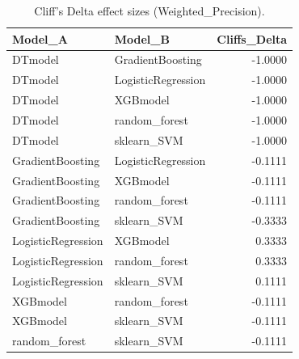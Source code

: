 \begin{table}[t]
\centering
\begin{tabular}{llr}
\toprule
Model_A & Model_B & Cliffs_Delta \\
\midrule
DTmodel & GradientBoosting & -1.0000 \\
DTmodel & LogisticRegression & -1.0000 \\
DTmodel & XGBmodel & -1.0000 \\
DTmodel & random_forest & -1.0000 \\
DTmodel & sklearn_SVM & -1.0000 \\
GradientBoosting & LogisticRegression & -0.1111 \\
GradientBoosting & XGBmodel & -0.1111 \\
GradientBoosting & random_forest & -0.1111 \\
GradientBoosting & sklearn_SVM & -0.3333 \\
LogisticRegression & XGBmodel & 0.3333 \\
LogisticRegression & random_forest & 0.3333 \\
LogisticRegression & sklearn_SVM & 0.1111 \\
XGBmodel & random_forest & -0.1111 \\
XGBmodel & sklearn_SVM & -0.1111 \\
random_forest & sklearn_SVM & -0.1111 \\
\bottomrule
\end{tabular}
\caption{Cliff's Delta effect sizes (Weighted_Precision).}
\label{tab:cliffs_Weighted_Precision}
\end{table}